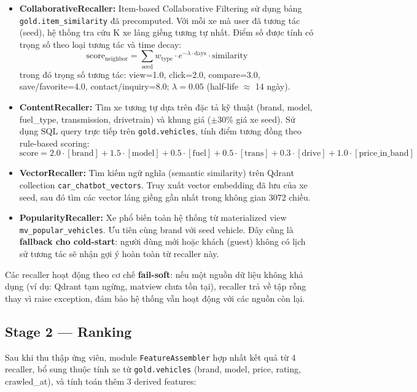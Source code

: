 \begin{itemize}
    \item \textbf{CollaborativeRecaller:} Item-based Collaborative Filtering sử dụng bảng \texttt{gold.item\_similarity} đã precomputed. Với mỗi xe mà user đã tương tác (seed), hệ thống tra cứu K xe láng giềng tương tự nhất. Điểm số được tính có trọng số theo loại tương tác và time decay:
    \[
    \text{score}_{\text{neighbor}} = \sum_{\text{seed}} w_{\text{type}} \cdot e^{-\lambda \cdot \text{days}} \cdot \text{similarity}
    \]
    trong đó trọng số tương tác: view=1.0, click=2.0, compare=3.0, save/favorite=4.0, contact/inquiry=8.0; $\lambda = 0.05$ (half-life $\approx$ 14 ngày).

    \item \textbf{ContentRecaller:} Tìm xe tương tự dựa trên đặc tả kỹ thuật (brand, model, fuel\_type, transmission, drivetrain) và khung giá ($\pm$30\% giá xe seed). Sử dụng SQL query trực tiếp trên \texttt{gold.vehicles}, tính điểm tương đồng theo rule-based scoring:
    \[
    \text{score} = 2.0 \cdot [\text{brand}] + 1.5 \cdot [\text{model}] + 0.5 \cdot [\text{fuel}] + 0.5 \cdot [\text{trans}] + 0.3 \cdot [\text{drive}] + 1.0 \cdot [\text{price\_in\_band}]
    \]

    \item \textbf{VectorRecaller:} Tìm kiếm ngữ nghĩa (semantic similarity) trên Qdrant collection \texttt{car\_chatbot\_vectors}. Truy xuất vector embedding đã lưu của xe seed, sau đó tìm các vector láng giềng gần nhất trong không gian 3072 chiều.

    \item \textbf{PopularityRecaller:} Xe phổ biến toàn hệ thống từ materialized view \texttt{mv\_popular\_vehicles}. Ưu tiên cùng brand với seed vehicle. Đây cũng là \textbf{fallback cho cold-start}: người dùng mới hoặc khách (guest) không có lịch sử tương tác sẽ nhận gợi ý hoàn toàn từ recaller này.
\end{itemize}

Các recaller hoạt động theo cơ chế \textbf{fail-soft}: nếu một nguồn dữ liệu không khả dụng (ví dụ: Qdrant tạm ngừng, matview chưa tồn tại), recaller trả về tập rỗng thay vì raise exception, đảm bảo hệ thống vẫn hoạt động với các nguồn còn lại.

\subsection{Stage 2 — Ranking}

Sau khi thu thập ứng viên, module \texttt{FeatureAssembler} hợp nhất kết quả từ 4 recaller, bổ sung thuộc tính xe từ \texttt{gold.vehicles} (brand, model, price, rating, crawled\_at), và tính toán thêm 3 derived features:

